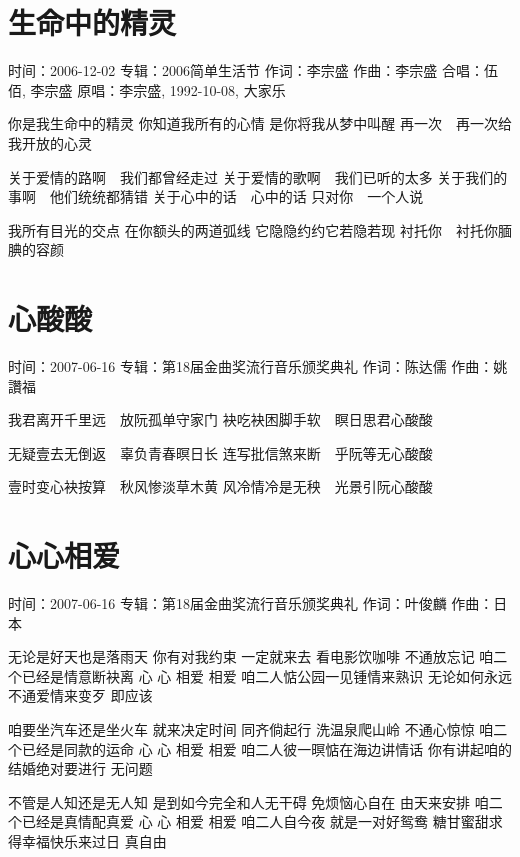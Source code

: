 \documentclass[UTF8,a4paper,oneside,twocolumn,12pt]{ctexbook}
\newcommand{\infopair}[2]{\textbullet #1：#2}
\newcommand{\zc}[1][伍佰]{\infopair{作词}{#1}}
\newcommand{\zq}[1][伍佰]{\infopair{作曲}{#1}}
\newcommand{\zj}[1]{\infopair{专辑}{#1}}
\newcommand{\yc}[1]{\infopair{原唱}{#1}}
\newcommand{\sj}[1]{\infopair{时间}{#1}}
\newenvironment{info}{\begin{flushleft}\kaishu
	}
	{\end{flushleft}\normalsize\yahei\par}
\newenvironment{lyric}{
	}
{}
\begin{document}
\section{生命中的精灵}
\begin{info}
	\sj{2006-12-02}
	\zj{2006简单生活节}
	\zc[李宗盛]
	\zq[李宗盛]
	\infopair{合唱}{伍佰, 李宗盛}
	\yc{李宗盛, 1992-10-08, 大家乐}
\end{info}
\begin{lyric}
	你是我生命中的精灵
	你知道我所有的心情
	是你将我从梦中叫醒
	再一次　再一次给我开放的心灵

	关于爱情的路啊　我们都曾经走过
	关于爱情的歌啊　我们已听的太多
	关于我们的事啊　他们统统都猜错
	关于心中的话　心中的话
	只对你　一个人说

	我所有目光的交点
	在你额头的两道弧线
	它隐隐约约它若隐若现
	衬托你　衬托你腼腆的容颜
\end{lyric}

\section{心酸酸}
\begin{info}
	\sj{2007-06-16}
	\zj{第18届金曲奖流行音乐颁奖典礼}
	\zc[陈达儒]
	\zq[姚讚福]
\end{info}
\begin{lyric}
	我君离开千里远　放阮孤单守家门
	袂吃袂困脚手软　瞑日思君心酸酸

	无疑壹去无倒返　辜负青春暝日长
	连写批信煞来断　乎阮等无心酸酸

	壹时变心袂按算　秋风惨淡草木黄
	风冷情冷是无秧　光景引阮心酸酸
\end{lyric}

\section{心心相爱}%
\begin{info}
	\sj{2007-06-16}
	\zj{第18届金曲奖流行音乐颁奖典礼}
	\zc[叶俊麟]
	\zq[日本]
\end{info}
\begin{lyric} %
	无论是好天也是落雨天
	你有对我约束
	一定就来去
	看电影饮咖啡 不通放忘记
	咱二个已经是情意断袂离
	心 心 相爱 相爱
	咱二人惦公园一见锺情来熟识
	无论如何永远不通爱情来变歹
	即应该

	咱要坐汽车还是坐火车
	就来决定时间
	同齐倘起行
	洗温泉爬山岭 不通心惊惊
	咱二个已经是同款的运命
	心 心 相爱 相爱
	咱二人彼一暝惦在海边讲情话
	你有讲起咱的结婚绝对要进行
	无问题

	不管是人知还是无人知
	是到如今完全和人无干碍
	免烦恼心自在 由天来安排
	咱二个已经是真情配真爱
	心 心 相爱 相爱
	咱二人自今夜 就是一对好鸳鸯
	糖甘蜜甜求得幸福快乐来过日
	真自由
\end{lyric}
\end{document}
